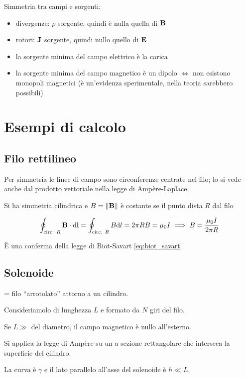 Simmetria tra campi e sorgenti:
\begin{itemize}
    \item divergenze: $\rho$ sorgente, quindi è nulla quella di $\mathbf{B}$
    \item rotori: $\mathbf{J}$ sorgente, quindi nullo quello di $\mathbf{E}$
    \item la sorgente minima del campo elettrico è la carica
    \item la sorgente minima del campo magnetico è un dipolo $\iff$ non esistono monopoli magnetici (è un'evidenza sperimentale, nella teoria sarebbero possibili)
\end{itemize}

\section{Esempi di calcolo}

\subsection{Filo rettilineo}

Per simmetria le linee di campo sono circonferenze centrate nel filo; lo si vede anche dal prodotto vettoriale nella legge di Ampère-Laplace.

Si ha simmetria cilindrica e $B = \left\lVert \mathbf{B} \right\rVert$ è costante se il punto dista $R$ dal filo

\begin{equation}
    \oint_\text{circ. $R$} \mathbf{B} \cdot \mathrm{d} \mathbf{l}
    = \oint_\text{circ. $R$} B \mathrm{d} l
    = 2\pi R B
    = \mu_0 I \implies B
    = \frac{\mu_0 I}{2\pi R}
\end{equation}

È una conferma della legge di Biot-Savart \eqref{eq:biot_savart}.

\subsection{Solenoide}

= filo ``arrotolato'' attorno a un cilindro.

Consideriamolo di lunghezza $L$ e formato da $N$ giri del filo.

Se $L \gg$ del diametro, il campo magnetico è nullo all'esterno.

Si applica la legge di Ampère su un a sezione rettangolare che interseca la superficie del cilindro.

La curva è $\gamma$ e il lato parallelo all'asse del solenoide è $h \ll L$.

